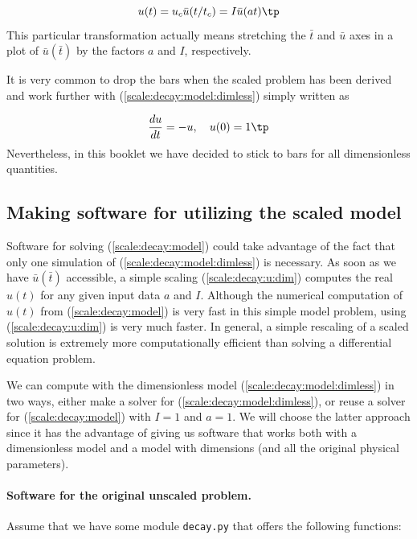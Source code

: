 \documentclass[graybox,envcountchap,sectrefs,final]{svmonodo}
\begin{document}
\begin{equation}
u(t) = u_c\bar u(t/t_c) = I\bar u(at)
\tp
\label{scale:decay:u:dim}
\end{equation}
This particular transformation actually means stretching the $\bar t$ and
$\bar u$ axes in a plot of $\bar u(\bar t)$ by the factors $a$ and $I$,
respectively.

It is very common to drop the bars when the scaled problem has been
derived and work further with (\ref{scale:decay:model:dimless}) simply
written as

\[
\frac{du}{dt} = -u,\quad u(0)=1
\tp
\]
Nevertheless, in this booklet we have decided to stick to bars for all
dimensionless quantities.


\subsection{Making software for utilizing the scaled model}
\label{sec:scale:decay:prog}

Software for solving (\ref{scale:decay:model}) could take advantage of
the fact that only one simulation of (\ref{scale:decay:model:dimless})
is necessary. As soon as we have $\bar u(\bar t)$ accessible, a simple
scaling (\ref{scale:decay:u:dim}) computes the real $u(t)$ for any
given input data $a$ and $I$. Although the numerical computation of
$u(t)$ from (\ref{scale:decay:model}) is very fast in this simple model
problem, using (\ref{scale:decay:u:dim}) is very much faster. In
general, a simple rescaling of a scaled solution is extremely more
computationally efficient than solving a differential equation
problem.

We can compute with the dimensionless model (\ref{scale:decay:model:dimless})
in two ways, either make a solver for (\ref{scale:decay:model:dimless}),
or reuse a solver for (\ref{scale:decay:model}) with
$I=1$ and $a=1$.
We will choose the latter approach since it has the advantage of giving us
software that works both with a dimensionless model and a model
with dimensions (and all the original physical parameters).

\paragraph{Software for the original unscaled problem.}
Assume that we have some module \texttt{decay.py} that offers the following functions:
\end{document}
